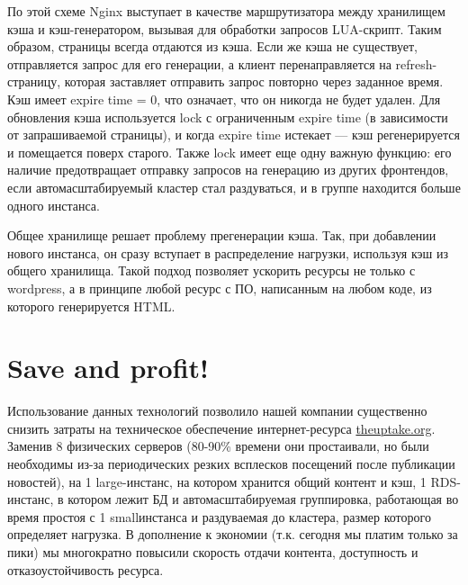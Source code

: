 \documentclass[10pt, a5paper]{article}
\begin{document}
\begin{figure}[ht]
\label{pic:kraev}
\end{figure}

По этой схеме Nginx выступает в качестве маршрутизатора между хранилищем кэша и кэш-генератором, вызывая для обработки запросов LUA-скрипт. Таким образом, страницы всегда отдаются из кэша. Если же кэша не существует, отправляется запрос для его генерации, а клиент перенаправляется на refresh-страницу, которая заставляет отправить запрос повторно через заданное время. Кэш имеет expire time = 0, что означает,  что он никогда не будет удален. Для обновления кэша используется lock с ограниченным expire time (в зависимости от запрашиваемой страницы), и когда expire time истекает --- кэш регенерируется и помещается поверх старого. Также lock имеет еще одну важную функцию: его наличие предотвращает отправку запросов на генерацию из других фронтендов, если  автомасштабируемый кластер стал раздуваться, и в группе находится больше одного инстанса. 

Общее хранилище решает проблему прегенерации кэша. Так, при добавлении нового инстанса, он сразу вступает в распределение нагрузки, используя кэш из общего хранилища.  Такой подход позволяет ускорить ресурсы не только с wordpress, а в принципе любой ресурс с ПО, написанным на любом коде, из которого генерируется HTML.

\section*{Save and profit!}

Использование данных технологий позволило нашей компании существенно снизить затраты на техническое обеспечение интернет-ресурса \url{theuptake.org}. Заменив 8 физических серверов (80-90\% времени они простаивали, но были необходимы из-за периодических резких всплесков посещений после публикации новостей), на 1 large-инстанс, на котором хранится общий контент и кэш, 1 RDS-инстанс, в котором лежит БД и автомасштабируемая группировка, работающая во время простоя с 1 smallинстанса и раздуваемая до кластера, размер которого определяет нагрузка. В дополнение к экономии (т.к. сегодня мы платим только за пики) мы многократно повысили скорость отдачи контента,  доступность и отказоустойчивость ресурса. 
\end{document}
